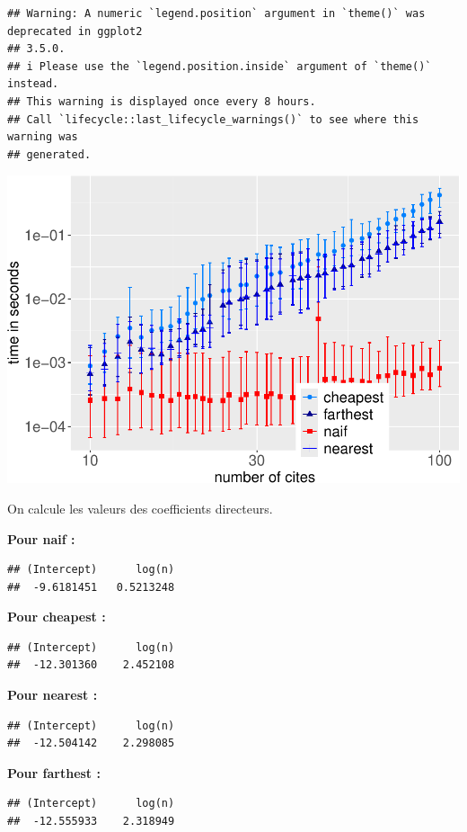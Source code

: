 \documentclass[
]{article}
\begin{document}
\begin{verbatim}
## Warning: A numeric `legend.position` argument in `theme()` was deprecated in ggplot2
## 3.5.0.
## i Please use the `legend.position.inside` argument of `theme()` instead.
## This warning is displayed once every 8 hours.
## Call `lifecycle::last_lifecycle_warnings()` to see where this warning was
## generated.
\end{verbatim}

\includegraphics{TSP_analyse_files/figure-latex/unnamed-chunk-22-1.pdf}

On calcule les valeurs des coefficients directeurs.

\textbf{Pour naif :}

\begin{verbatim}
## (Intercept)      log(n) 
##  -9.6181451   0.5213248
\end{verbatim}

\textbf{Pour cheapest :}

\begin{verbatim}
## (Intercept)      log(n) 
##  -12.301360    2.452108
\end{verbatim}

\textbf{Pour nearest :}

\begin{verbatim}
## (Intercept)      log(n) 
##  -12.504142    2.298085
\end{verbatim}

\textbf{Pour farthest : }

\begin{verbatim}
## (Intercept)      log(n) 
##  -12.555933    2.318949
\end{verbatim}
\end{document}

